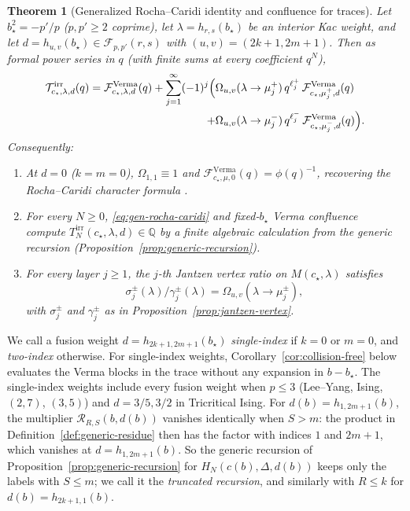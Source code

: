 \documentclass[twoside,10pt]{article}
\numberwithin{equation}{section}
\theoremstyle{slbody}
\newtheorem{theorem}{Theorem}[section]
\theoremstyle{definition}
\theoremstyle{remark}
\begin{document}
\begin{theorem}[Generalized Rocha--Caridi identity and confluence for traces]\label{thm:gen-rocha-caridi}
Let \(b_\star^2=-p'/p\) (\(p,p'\geq2\) coprime), let
\(\lambda=h_{r,s}(b_\star)\) be an interior Kac weight, and let
\(d=h_{u,v}(b_\star)\in\mathcal{F}_{p,p'}(r,s)\) with
\((u,v)=(2k+1,2m+1)\).  Then as formal power series in \(q\) (with finite sums
at every coefficient \(q^N\)),
\begin{equation}\label{eq:gen-rocha-caridi}
 \begin{aligned}
 \mathcal{T}^{\mathrm{irr}}_{c_\star,\lambda,d}(q)
 =\mathcal{F}^{\mathrm{Verma}}_{c_\star,\lambda,d}(q)
  +\sum_{j=1}^\infty(-1)^j\Bigl(
    &\Omega_{u,v}(\lambda\to\mu^+_j)\,q^{\ell^+_j}\,
    \mathcal{F}^{\mathrm{Verma}}_{c_\star,\mu^+_j,d}(q)\\
   +&\Omega_{u,v}(\lambda\to\mu^-_j)\,q^{\ell^-_j}\,
    \mathcal{F}^{\mathrm{Verma}}_{c_\star,\mu^-_j,d}(q)\Bigr).
 \end{aligned}
\end{equation}
Consequently:
\begin{enumerate}
 \item[(a)] At \(d=0\) (\(k=m=0\)), \(\Omega_{1,1}\equiv1\) and
   \(\mathcal{F}^{\mathrm{Verma}}_{c_\star,\mu,0}(q)=\phi(q)^{-1}\),
   recovering the Rocha--Caridi character formula \cite{RochaCaridi1985}.
 \item[(b)] For every \(N\geq0\), \eqref{eq:gen-rocha-caridi} and
   fixed-\(b_\star\) Verma confluence~\cite[Theorem~7.3]{PolzerColliding2026}
   compute \(T^{\mathrm{irr}}_N(c_\star,\lambda,d)\in\mathbb{Q}\) by a finite
   algebraic calculation from the generic recursion
   (Proposition~\ref{prop:generic-recursion}).
 \item[(c)] For every layer \(j\geq1\), the \(j\)-th Jantzen vertex ratio on
   \(M(c_\star,\lambda)\) satisfies
   \[
    \sigma^\pm_j(\lambda)/\gamma^\pm_j(\lambda)
    =\Omega_{u,v}(\lambda\to\mu^\pm_j),
   \]
   with \(\sigma^\pm_j\) and \(\gamma^\pm_j\) as in
   Proposition~\ref{prop:jantzen-vertex}.
\end{enumerate}
\end{theorem}

We call a fusion weight \(d=h_{2k+1,2m+1}(b_\star)\) \emph{single-index} if
\(k=0\) or \(m=0\), and \emph{two-index} otherwise.  For single-index weights,
Corollary~\ref{cor:collision-free} below evaluates the Verma blocks in the trace
without any expansion in \(b-b_\star\).  The single-index weights
include every fusion weight when \(p\leq3\) (Lee--Yang, Ising, \((2,7)\),
\((3,5)\)) and \(d=3/5,3/2\) in Tricritical Ising.  For
\(d(b)=h_{1,2m+1}(b)\), the multiplier \(\mathcal{R}_{R,S}(b,d(b))\) vanishes
identically when \(S>m\): the product in Definition~\ref{def:generic-residue}
then has the factor with indices \(1\) and \(2m+1\), which vanishes at
\(d=h_{1,2m+1}(b)\).  So
the generic recursion of Proposition~\ref{prop:generic-recursion} for
\(H_N(c(b),\Delta,d(b))\) keeps only the labels with \(S\leq m\); we call it
the \emph{truncated recursion}, and similarly with \(R\leq k\) for
\(d(b)=h_{2k+1,1}(b)\).
\end{document}

